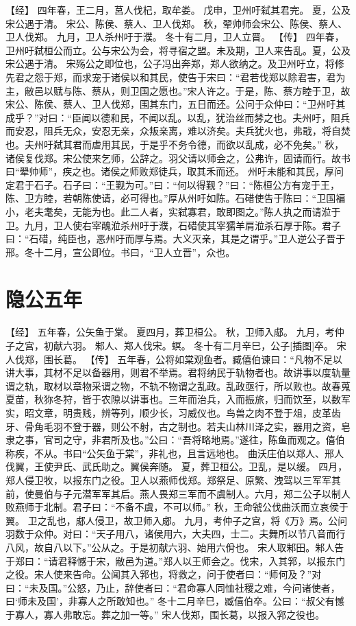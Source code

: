 \documentclass[a4paper,12pt,UTF8,twoside]{ctexbook}
\begin{document}
【经】
四年春，王二月，莒人伐杞，取牟娄。
戊申，卫州吁弑其君完。
夏，公及宋公遇于清。
宋公、陈侯、蔡人、卫人伐郑。
秋，翚帅师会宋公、陈侯、蔡人、卫人伐郑。
九月，卫人杀州吁于濮。
冬十有二月，卫人立晋。
【传】
四年春，卫州吁弑桓公而立。公与宋公为会，将寻宿之盟。未及期，卫人来告乱。夏，公及宋公遇于清。
宋殇公之即位也，公子冯出奔郑，郑人欲纳之。及卫州吁立，将修先君之怨于郑，而求宠于诸侯以和其民，使告于宋曰：“君若伐郑以除君害，君为主，敝邑以赋与陈、蔡从，则卫国之愿也。”宋人许之。于是，陈、蔡方睦于卫，故宋公、陈侯、蔡人、卫人伐郑，围其东门，五日而还。公问于众仲曰：“卫州吁其成乎？”对曰：“臣闻以德和民，不闻以乱。以乱，犹治丝而棼之也。夫州吁，阻兵而安忍，阻兵无众，安忍无亲，众叛亲离，难以济矣。夫兵犹火也，弗戢，将自焚也。夫州吁弑其君而虐用其民，于是乎不务令德，而欲以乱成，必不免矣。”
秋，诸侯复伐郑。宋公使来乞师，公辞之。羽父请以师会之，公弗许，固请而行。故书曰“翚帅师”，疾之也。诸侯之师败郑徒兵，取其禾而还。
州吁未能和其民，厚问定君于石子。石子曰：“王觐为可。”曰：“何以得觐？”曰：“陈桓公方有宠于王，陈、卫方睦，若朝陈使请，必可得也。”厚从州吁如陈。石碏使告于陈曰：“卫国褊小，老夫耄矣，无能为也。此二人者，实弑寡君，敢即图之。”陈人执之而请涖于卫。九月，卫人使右宰醜涖杀州吁于濮，石碏使其宰獳羊肩涖杀石厚于陈。君子曰：“石碏，纯臣也，恶州吁而厚与焉。大义灭亲，其是之谓乎。”卫人逆公子晋于邢。冬十二月，宣公即位。书曰，“卫人立晋”，众也。

\section{隐公五年}

【经】
五年春，公矢鱼于棠。
夏四月，葬卫桓公。
秋，卫师入郕。
九月，考仲子之宫，初献六羽。
邾人、郑人伐宋。螟。
冬十有二月辛巳，公子[插图]卒。
宋人伐郑，围长葛。
【传】
五年春，公将如棠观鱼者。臧僖伯谏曰：“凡物不足以讲大事，其材不足以备器用，则君不举焉。君将纳民于轨物者也。故讲事以度轨量谓之轨，取材以章物采谓之物，不轨不物谓之乱政。乱政亟行，所以败也。故春蒐夏苗，秋狝冬狩，皆于农隙以讲事也。三年而治兵，入而振旅，归而饮至，以数军实，昭文章，明贵贱，辨等列，顺少长，习威仪也。鸟兽之肉不登于俎，皮革齿牙、骨角毛羽不登于器，则公不射，古之制也。若夫山林川泽之实，器用之资，皂隶之事，官司之守，非君所及也。”公曰：“吾将略地焉。”遂往，陈鱼而观之。僖伯称疾，不从。书曰“公矢鱼于棠”，非礼也，且言远地也。
曲沃庄伯以郑人、邢人伐翼，王使尹氏、武氏助之。翼侯奔随。
夏，葬卫桓公。卫乱，是以缓。
四月，郑人侵卫牧，以报东门之役。卫人以燕师伐郑。郑祭足、原繁、洩驾以三军军其前，使曼伯与子元潜军军其后。燕人畏郑三军而不虞制人。六月，郑二公子以制人败燕师于北制。君子曰：“不备不虞，不可以师。”
秋，王命虢公伐曲沃而立哀侯于翼。
卫之乱也，郕人侵卫，故卫师入郕。
九月，考仲子之宫，将《万》焉。公问羽数于众仲。对曰：“天子用八，诸侯用六，大夫四，士二。夫舞所以节八音而行八风，故自八以下。”公从之。于是初献六羽、始用六佾也。
宋人取邾田。邾人告于郑曰：“请君释憾于宋，敝邑为道。”郑人以王师会之。伐宋，入其郛，以报东门之役。宋人使来告命。公闻其入郛也，将救之，问于使者曰：“师何及？”对曰：“未及国。”公怒，乃止，辞使者曰：“君命寡人同恤社稷之难，今问诸使者，曰‘师未及国’，非寡人之所敢知也。”
冬十二月辛巳，臧僖伯卒。公曰：“叔父有憾于寡人，寡人弗敢忘。葬之加一等。”
宋人伐郑，围长葛，以报入郛之役也。
\end{document}
